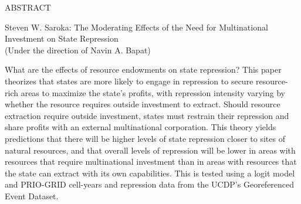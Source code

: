 
\begin{center}
\vspace*{52pt}
{ABSTRACT}
\vspace{11pt}

\begin{singlespace}
Steven W. Saroka: The Moderating Effects of the Need for Multinational Investment on State Repression \\
(Under the direction of Navin A. Bapat)
\end{singlespace}
\end{center}

What are the effects of resource endowments on state repression? This paper theorizes that states are more likely to engage in repression to secure resource-rich areas to maximize the state’s profits, with repression intensity varying by whether the resource requires outside investment to extract. Should resource extraction require outside investment, states must restrain their repression and share profits with an external multinational corporation. This theory yields predictions that there will be higher levels of state repression closer to sites of natural resources, and that overall levels of repression will be lower in areas with resources that require multinational investment than in areas with resources that the state can extract with its own capabilities. This is tested using a logit model and PRIO-GRID cell-years and repression data from the UCDP's Georeferenced Event Dataset.


\clearpage
